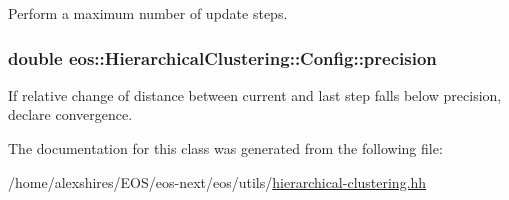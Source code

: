 Perform a maximum number of update steps. \hypertarget{classeos_1_1HierarchicalClustering_1_1Config_a4982011f9ceceaf71ade5e018072abf6}{
\subsubsection[{precision}]{\setlength{\rightskip}{0pt plus 5cm}double {\bf eos::HierarchicalClustering::Config::precision}}}
\label{classeos_1_1HierarchicalClustering_1_1Config_a4982011f9ceceaf71ade5e018072abf6}
If relative change of distance between current and last step falls below precision, declare convergence. 

The documentation for this class was generated from the following file:\begin{DoxyCompactItemize}
\item 
/home/alexshires/EOS/eos-\/next/eos/utils/\hyperlink{hierarchical-clustering_8hh}{hierarchical-\/clustering.hh}\end{DoxyCompactItemize}
